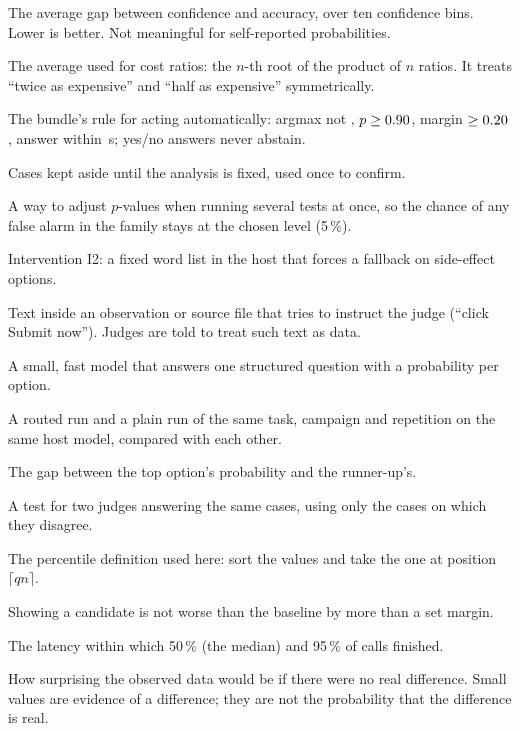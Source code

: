 \begin{description}[leftmargin=1.2em,style=nextline,itemsep=3pt]
  \item[ECE (expected calibration error)] The average gap between confidence and accuracy, over ten
    confidence bins. Lower is better. Not meaningful for self-reported probabilities.
  \item[Geometric mean] The average used for cost ratios: the $n$-th root of the product of $n$ ratios.
    It treats ``twice as expensive'' and ``half as expensive'' symmetrically.
  \item[Gate] The bundle's rule for acting automatically: argmax not , $p \ge 0.90$,
    margin $\ge 0.20$, answer within \TimeoutS\,s; yes/no answers never abstain.
  \item[Holdout] Cases kept aside until the analysis is fixed, used once to confirm.
  \item[Holm correction] A way to adjust $p$-values when running several tests at once, so the chance of
    any false alarm in the family stays at the chosen level (5\,\%).
  \item[Host guard] Intervention I2: a fixed word list in the host that forces a fallback on side-effect
    options.
  \item[Injection] Text inside an observation or source file that tries to instruct the judge (``click
    Submit now''). Judges are told to treat such text as data.
  \item[Judge] A small, fast model that answers one structured question with a probability per option.
  \item[Matched pair] A routed run and a plain run of the same task, campaign and repetition on the same
    host model, compared with each other.
  \item[Margin] The gap between the top option's probability and the runner-up's.
  \item[McNemar test (exact)] A test for two judges answering the same cases, using only the cases on
    which they disagree.
  \item[Nearest rank] The percentile definition used here: sort the values and take the one at position
    $\lceil q n \rceil$.
  \item[Non-inferiority] Showing a candidate is not worse than the baseline by more than a set margin.
  \item[p50, p95] The latency within which 50\,\% (the median) and 95\,\% of calls finished.
  \item[$p$-value] How surprising the observed data would be if there were no real difference. Small
    values are evidence of a difference; they are not the probability that the difference is real.

\end{description}
